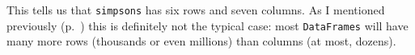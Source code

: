 This tells us that \texttt{simpsons} has six rows and seven columns. As I
mentioned previously (p.~\pageref{tallAndSkinny}) this is definitely not the
typical case: most \texttt{DataFrames} will have many more rows (thousands or
even millions) than columns (at most, dozens).


%
%
%
%
%
%
%
%
%
%
%
